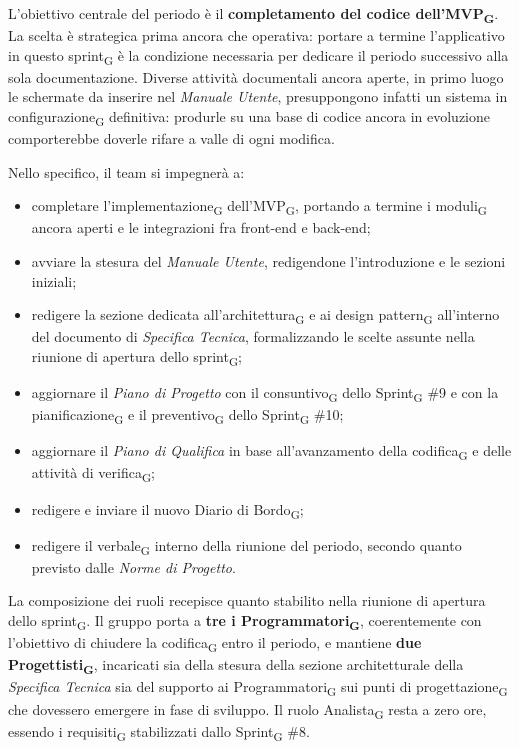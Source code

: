 ﻿\documentclass[a4paper, 10pt, colorlinks=true, linkcolor=black, urlcolor=blue, citecolor=blue, hidelinks]{article}
\begin{document}
L'obiettivo centrale del periodo è il \textbf{completamento del codice dell'MVP\textsubscript{G}}. La scelta è strategica prima ancora che operativa: portare a termine l'applicativo in questo sprint\textsubscript{G} è la condizione necessaria per dedicare il periodo successivo alla sola documentazione. Diverse attività documentali ancora aperte, in primo luogo le schermate da inserire nel \textit{Manuale Utente}, presuppongono infatti un sistema in configurazione\textsubscript{G} definitiva: produrle su una base di codice ancora in evoluzione comporterebbe doverle rifare a valle di ogni modifica.

Nello specifico, il team si impegnerà a:
\begin{itemize}
    \item completare l'implementazione\textsubscript{G} dell'MVP\textsubscript{G}, portando a termine i moduli\textsubscript{G} ancora aperti e le integrazioni fra front-end e back-end;

    \item avviare la stesura del \textit{Manuale Utente}, redigendone l'introduzione e le sezioni iniziali;

    \item redigere la sezione dedicata all'architettura\textsubscript{G} e ai design pattern\textsubscript{G} all'interno del documento di \textit{Specifica Tecnica}, formalizzando le scelte assunte nella riunione di apertura dello sprint\textsubscript{G};

    \item aggiornare il \textit{Piano di Progetto} con il consuntivo\textsubscript{G} dello Sprint\textsubscript{G} \#9 e con la pianificazione\textsubscript{G} e il preventivo\textsubscript{G} dello Sprint\textsubscript{G} \#10;

    \item aggiornare il \textit{Piano di Qualifica} in base all'avanzamento della codifica\textsubscript{G} e delle attività di verifica\textsubscript{G};

    \item redigere e inviare il nuovo Diario di Bordo\textsubscript{G};

    \item redigere il verbale\textsubscript{G} interno della riunione del periodo, secondo quanto previsto dalle \textit{Norme di Progetto}.
\end{itemize}

La composizione dei ruoli recepisce quanto stabilito nella riunione di apertura dello sprint\textsubscript{G}. Il gruppo porta a \textbf{tre i Programmatori\textsubscript{G}}, coerentemente con l'obiettivo di chiudere la codifica\textsubscript{G} entro il periodo, e mantiene \textbf{due Progettisti\textsubscript{G}}, incaricati sia della stesura della sezione architetturale della \textit{Specifica Tecnica} sia del supporto ai Programmatori\textsubscript{G} sui punti di progettazione\textsubscript{G} che dovessero emergere in fase di sviluppo. Il ruolo Analista\textsubscript{G} resta a zero ore, essendo i requisiti\textsubscript{G} stabilizzati dallo Sprint\textsubscript{G} \#8.
\end{document}

